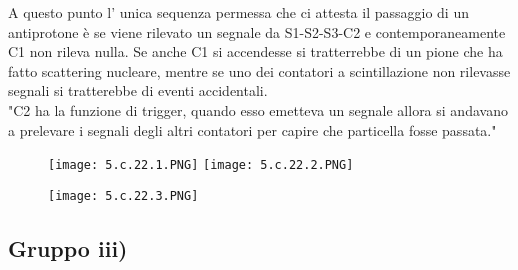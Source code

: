 \documentclass[twoside]{article}
\begin{document}
A questo punto l' unica sequenza permessa che ci attesta il passaggio di un antiprotone è se viene rilevato un segnale da S1-S2-S3-C2 e contemporaneamente C1 non rileva nulla. Se anche C1 si accendesse si tratterrebbe di un pione che ha fatto scattering nucleare, mentre se uno dei contatori a scintillazione non rilevasse segnali si tratterebbe di eventi accidentali.\\
"C2 ha la funzione di trigger, quando esso emetteva un segnale allora si andavano a prelevare i segnali degli altri contatori per capire che particella fosse passata."
\begin{figure}[H]
    \centering
    \texttt{[image: 5.c.22.1.PNG]}
    \texttt{[image: 5.c.22.2.PNG]}
    \label{fig:5.c.22.1}
\end{figure}
\begin{figure}[H]
    \centering
    \texttt{[image: 5.c.22.3.PNG]}
    \label{fig:5.c.22.3}
\end{figure}


\newpage
\subsection*{Gruppo iii)}
\end{document}

